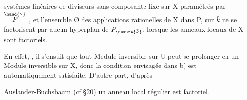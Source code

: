 
systêmes linéaires de diviseurs sans composante fixe  sur X paramétrés
par $\overset{\hand{\vee}}{P}$ , et l'ensemble Ø  des applications rationelles de X dans P, 
sur $\bar{k}$ ne se factorisent par aucun hyperplan de $P_{\unsure{\bar{k}}}$.
lorsque les anneaux locaux de X sont factoriels.

En effet,  , il s'ensuit que tout Module inversible sur
U peut se prolonger en un Module inversible sur X, donc la condition
envisagée dans b) est automatiquement satisfaite. D'autre part, d'après

Auslander-Buchsbaum (cf §20) un annea\hand{/}u local
régulier est factoriel.









%






%


